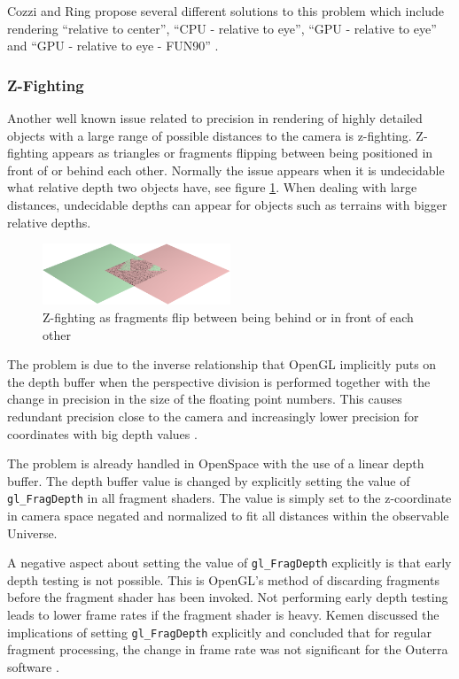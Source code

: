 Cozzi and Ring propose several different solutions to this problem which include rendering ``relative to center'', ``CPU - relative to eye'', ``GPU - relative to eye'' and ``GPU - relative to eye - FUN90'' \cite{cozzi11}. 

\subsubsection{Z-Fighting}

Another well known issue related to precision in rendering of highly detailed objects with a large range of possible distances to the camera is z-fighting. Z-fighting appears as triangles or fragments flipping between being positioned in front of or behind each other. Normally the issue appears when it is undecidable what relative depth two objects have, see figure \ref{fig:zfighting}. When dealing with large distances, undecidable depths can appear for objects such as terrains with bigger relative depths.

\begin{figure}[htbp]
    \centering
    \includegraphics[width=0.5\textwidth]{figures/zfighting.png}
    \caption{Z-fighting as fragments flip between being behind or in front of each other}
    \label{fig:zfighting}
\end{figure}

The problem is due to the inverse relationship that OpenGL implicitly puts on the depth buffer when the perspective division is performed together with the change in precision in the size of the floating point numbers. This causes redundant precision close to the camera and increasingly lower precision for coordinates with big depth values \cite{cozzi11}.

The problem is already handled in OpenSpace with the use of a linear depth buffer. The depth buffer value is changed by explicitly setting the value of \texttt{gl\_FragDepth} in all fragment shaders. The value is simply set to the z-coordinate in camera space negated and normalized to fit all distances within the observable Universe.

A negative aspect about setting the value of \texttt{gl\_FragDepth} explicitly is that early depth testing is not possible. This is OpenGL's method of discarding fragments before the fragment shader has been invoked. Not performing early depth testing leads to lower frame rates if the fragment shader is heavy. Kemen discussed the implications of setting \texttt{gl\_FragDepth} explicitly and concluded that for regular fragment processing, the change in frame rate was not significant for the Outerra software \cite{kemen12}.

